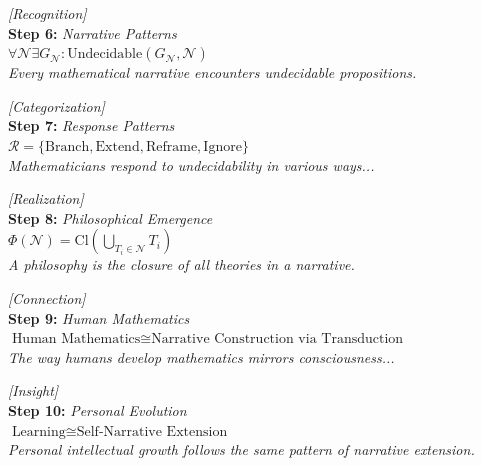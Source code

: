 \documentclass[runningheads]{llncs}
\begin{document}
\vspace{0.8em}

\noindent\textit{[Recognition]}\\
\noindent\textbf{Step 6:} \hfill \textit{Narrative Patterns}\\
\noindent$\forall \mathcal{N} \exists G_{\mathcal{N}} : \text{Undecidable}(G_{\mathcal{N}}, \mathcal{N})$\\
\textit{Every mathematical narrative encounters undecidable propositions.}

\vspace{0.8em}

\noindent\textit{[Categorization]}\\
\noindent\textbf{Step 7:} \hfill \textit{Response Patterns}\\
\noindent$\mathcal{R} = \{\text{Branch}, \text{Extend}, \text{Reframe}, \text{Ignore}\}$\\
\textit{Mathematicians respond to undecidability in various ways...}

\vspace{0.8em}

\noindent\textit{[Realization]}\\
\noindent\textbf{Step 8:} \hfill \textit{Philosophical Emergence}\\
\noindent$\Phi(\mathcal{N}) = \text{Cl}\left(\bigcup_{T_i \in \mathcal{N}} T_i\right)$\\
\textit{A philosophy is the closure of all theories in a narrative.}

\vspace{0.8em}

\noindent\textit{[Connection]}\\
\noindent\textbf{Step 9:} \hfill \textit{Human Mathematics}\\
\noindent$\text{Human Mathematics} \cong \text{Narrative Construction via Transduction}$\\
\textit{The way humans develop mathematics mirrors consciousness...}

\vspace{0.8em}

\noindent\textit{[Insight]}\\
\noindent\textbf{Step 10:} \hfill \textit{Personal Evolution}\\
\noindent$\text{Learning} \cong \text{Self-Narrative Extension}$\\
\textit{Personal intellectual growth follows the same pattern of narrative extension.}

\vspace{0.8em}
\end{document}

